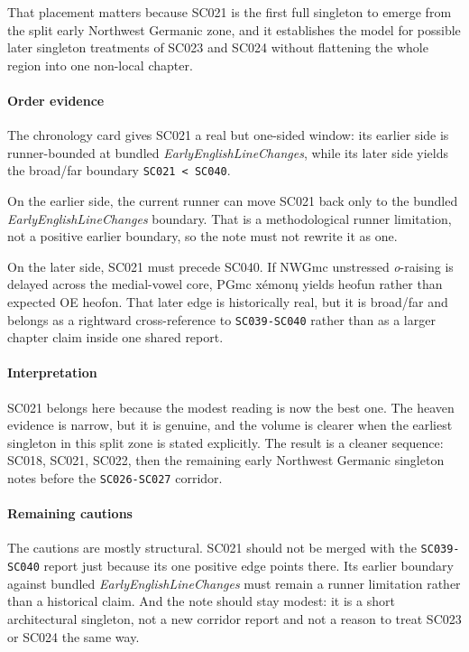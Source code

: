 \documentclass[
  british,
  a4paper,
]{article}
\begin{document}
That placement matters because SC021 is the first full singleton to
emerge from the split early Northwest Germanic zone, and it establishes
the model for possible later singleton treatments of SC023 and SC024
without flattening the whole region into one non-local chapter.

\paragraph{Order evidence}\label{order-evidence-14}

The chronology card gives SC021 a real but one-sided window: its earlier
side is runner-bounded at bundled \emph{EarlyEnglishLineChanges}, while
its later side yields the broad/far boundary
\texttt{SC021\ \textless{}\ SC040}.

On the earlier side, the current runner can move SC021 back only to the
bundled \emph{EarlyEnglishLineChanges} boundary. That is a
methodological runner limitation, not a positive earlier boundary, so
the note must not rewrite it as one.

On the later side, SC021 must precede SC040. If NWGmc unstressed
\emph{o}-raising is delayed across the medial-vowel core, PGmc xémonų
yields heofun rather than expected OE heofon. That later edge is
historically real, but it is broad/far and belongs as a rightward
cross-reference to \texttt{SC039-SC040} rather than as a larger chapter
claim inside one shared report.

\paragraph{Interpretation}\label{interpretation-14}

SC021 belongs here because the modest reading is now the best one. The
heaven evidence is narrow, but it is genuine, and the volume is clearer
when the earliest singleton in this split zone is stated explicitly. The
result is a cleaner sequence: SC018, SC021, SC022, then the remaining
early Northwest Germanic singleton notes before the \texttt{SC026-SC027}
corridor.

\paragraph{Remaining cautions}\label{remaining-cautions-14}

The cautions are mostly structural. SC021 should not be merged with the
\texttt{SC039-SC040} report just because its one positive edge points
there. Its earlier boundary against bundled
\emph{EarlyEnglishLineChanges} must remain a runner limitation rather
than a historical claim. And the note should stay modest: it is a short
architectural singleton, not a new corridor report and not a reason to
treat SC023 or SC024 the same way.
\end{document}
